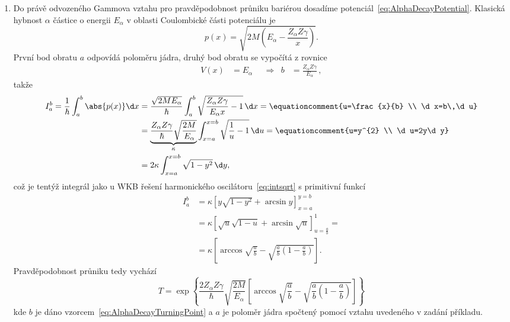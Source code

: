 \begin{solution}
\begin{enumerate}
	\item
		Do právě odvozeného Gammova vztahu pro pravděpodobnost průniku bariérou dosadíme potenciál~\eqref{eq:AlphaDecayPotential}.
		Klasická hybnost $\alpha$ částice o energii $E_{\alpha}$ v oblasti Coulombické části potenciálu je
		\begin{equation}
			p(x)=\sqrt{2M\left(E_{\alpha}-\frac{Z_{\alpha}Z\gamma}{x}\right)}.
		\end{equation}
		První bod obratu $a$ odpovídá poloměru jádra, druhý bod obratu se vypočítá z rovnice
		\begin{align}
			\label{eq:AlphaDecayTurningPoint}
			V(x)&=E_{\alpha} && \Longrightarrow & b&=\frac{Z_{\alpha}Z\gamma}{E_{\alpha}}\,,
		\end{align}
		takže
		\begin{align}
			I_{a}^{b}=\frac{1}{\hbar}\int_{a}^{b}\abs{p(x)}\d x
				&=\frac{\sqrt{2ME_{\alpha}}}{\hbar}\int_{a}^{b}\sqrt{\frac{Z_{\alpha}Z\gamma}{E_{\alpha}x}-1}\,\d x=\equationcomment{u=\frac{x}{b} \\ \d x=b\,\d u}\nonumber\\
				&=\underbrace{\frac{Z_{\alpha}Z\gamma}{\hbar}\sqrt{\frac{2M}{E_{\alpha}}}}_{\kappa}\int_{x=a}^{x=b}\sqrt{\frac{1}{u}-1}\,\d u=\equationcomment{u=y^{2} \\ \d u=2y\d y}\nonumber\\				
				&=2\kappa\int_{x=a}^{x=b}\sqrt{1-y^{2}}\,\d y,
		\end{align}
		což je tentýž integrál jako u WKB řešení harmonického oscilátoru~\eqref{eq:intsqrt} s primitivní funkcí
		\begin{align}
			I_{a}^{b}
				&=\kappa\left[y\sqrt{1-y^{2}}+\arcsin{y}\right]_{x=a}^{y=b}\nonumber\\
				&=\kappa\left[\sqrt{u}\sqrt{1-u}+\arcsin{\sqrt{u}}\right]_{u=\frac{a}{b}}^{1}=\nonumber\\
				&=\kappa\left[\arccos{\sqrt{\frac{a}{b}}}-\sqrt{\frac{a}{b}\left(1-\frac{a}{b}\right)}\right].
		\end{align}
		Pravděpodobnost průniku tedy vychází
		\begin{equation}
			T=\exp{\left\{\frac{2Z_{\alpha}Z\gamma}{\hbar}\sqrt{\frac{2M}{E_{\alpha}}}\left[\arccos{\sqrt{\frac{a}{b}}}-\sqrt{\frac{a}{b}\left(1-\frac{a}{b}\right)}\right]\right\}}
		\end{equation}
		kde $b$ je dáno vzorcem~\eqref{eq:AlphaDecayTurningPoint} a $a$ je poloměr jádra spočtený pomocí vztahu uvedeného v zadání příkladu.
		

\end{enumerate}
\end{solution}
